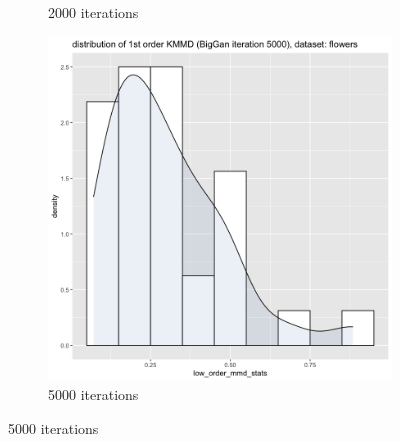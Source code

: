 \documentclass{article}
\begin{document}
\begin{figure}[h!]
\begin{subfigure}[b]{0.3\textwidth}
         \caption{2000 iterations}
     \end{subfigure}
     \hfill
     \begin{subfigure}[b]{0.3\textwidth}
         \centering
         \includegraphics[width=\textwidth]{kmmd_figures/biggan_flower_lowdist_5000.png}
         \caption{5000 iterations}
     \end{subfigure}
\end{figure}
\end{document}
